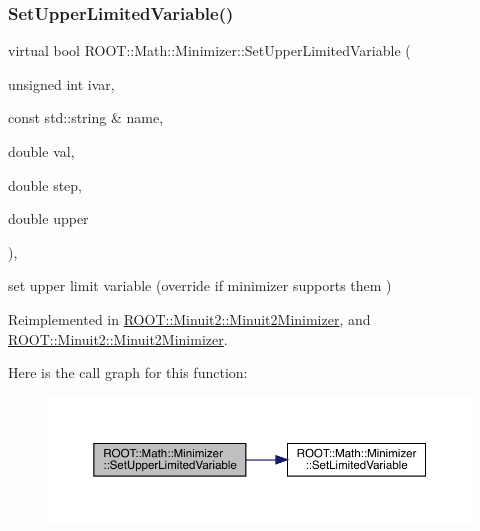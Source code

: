 \subsubsection{\texorpdfstring{SetUpperLimitedVariable()}{SetUpperLimitedVariable()}\hspace{0.1cm}{\footnotesize\ttfamily [2/2]}}
{\footnotesize\ttfamily virtual bool R\+O\+O\+T\+::\+Math\+::\+Minimizer\+::\+Set\+Upper\+Limited\+Variable (\begin{DoxyParamCaption}\item[{unsigned int}]{ivar,  }\item[{const std\+::string \&}]{name,  }\item[{double}]{val,  }\item[{double}]{step,  }\item[{double}]{upper }\end{DoxyParamCaption})\hspace{0.3cm}{\ttfamily [inline]}, {\ttfamily [virtual]}}



set upper limit variable (override if minimizer supports them ) 



Reimplemented in \mbox{\hyperlink{classROOT_1_1Minuit2_1_1Minuit2Minimizer_a70209b37c419af5d8d1475ce8de29b43}{R\+O\+O\+T\+::\+Minuit2\+::\+Minuit2\+Minimizer}}, and \mbox{\hyperlink{classROOT_1_1Minuit2_1_1Minuit2Minimizer_a70209b37c419af5d8d1475ce8de29b43}{R\+O\+O\+T\+::\+Minuit2\+::\+Minuit2\+Minimizer}}.

Here is the call graph for this function\+:
\nopagebreak
\begin{figure}[H]
\begin{center}
\leavevmode
\includegraphics[width=350pt]{dc/dc4/classROOT_1_1Math_1_1Minimizer_a804843fbaea82809b3c54232d0c1fe86_cgraph}
\end{center}
\end{figure}
\mbox{\label{classROOT_1_1Math_1_1Minimizer_a31289e6911a86aba956d0050cee2555b}} 
